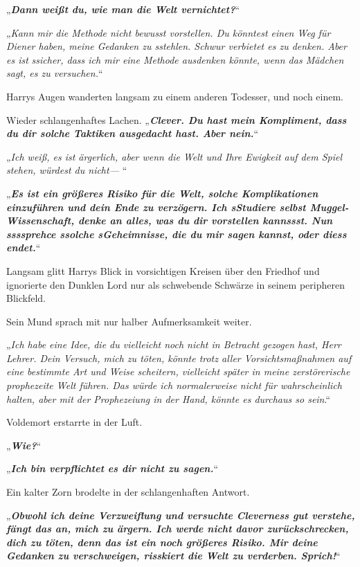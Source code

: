 {„\textbf{\emph{Dann weißt du, wie man die Welt vernichtet?}}“

„\emph{Kann mir die Methode nicht bewusst vorstellen. Du könntest einen Weg für Diener haben, meine Gedanken zu sstehlen. Schwur verbietet es zu denken. Aber es ist} \emph{ssicher, dass ich mir eine Methode ausdenken könnte, wenn das Mädchen sagt, es zu versuchen.}“

Harrys Augen wanderten langsam zu einem anderen Todesser, und noch einem.

Wieder schlangenhaftes Lachen. „\textbf{\emph{Clever. Du hast mein Kompliment, dass du dir solche Taktiken ausgedacht hast. Aber nein.}}“

„\emph{Ich weiß, es ist ärgerlich, aber wenn die Welt und Ihre Ewigkeit auf dem Spiel stehen, würdest du nicht—} “

„\textbf{\emph{Es ist ein größeres Risiko für die Welt, solche Komplikationen einzuführen und dein Ende zu verzögern. Ich sStudiere selbst Muggel-Wissenschaft, denke an alles, was du dir vorstellen kannssst. Nun ssssprehce ssolche sGeheimnisse, die du mir sagen kannst, oder diess endet.}}“

Langsam glitt Harrys Blick in vorsichtigen Kreisen über den Friedhof und ignorierte den Dunklen Lord nur als schwebende Schwärze in seinem peripheren Blickfeld.

Sein Mund sprach mit nur halber Aufmerksamkeit weiter.

„\emph{Ich habe eine Idee, die du vielleicht noch nicht in Betracht gezogen hast, Herr Lehrer. Dein Versuch, mich zu töten, könnte trotz aller Vorsichtsmaßnahmen auf eine bestimmte Art und Weise scheitern, vielleicht später in meine zerstörerische prophezeite Welt führen. Das würde ich normalerweise nicht für wahrscheinlich halten, aber mit der Prophezeiung in der Hand, könnte es durchaus so sein}.“

Voldemort erstarrte in der Luft.

„\textbf{\emph{Wie?}}“

„\textbf{\emph{Ich bin verpflichtet es dir nicht zu sagen.}}“

Ein kalter Zorn brodelte in der schlangenhaften Antwort.

„\textbf{\emph{Obwohl ich deine Verzweiflung und versuchte Cleverness gut verstehe, fängt das an, mich zu ärgern. Ich werde nicht davor zurückschrecken, dich zu töten, denn das ist ein noch größeres Risiko. Mir deine Gedanken zu verschweigen, risskiert die Welt zu verderben. Sprich!}}“

}
